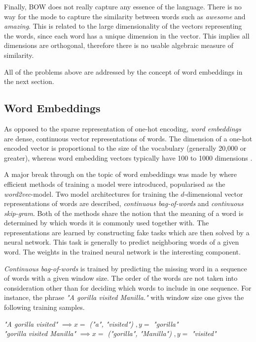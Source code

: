 Finally, BOW does not really capture any essence of the language. There is no way for the mode to capture the similarity between words such as \textit{awesome} and \textit{amazing}. This is related to the large dimensionality of the vectors representing the words, since each word has a unique dimension in the vector. This implies all dimensions are orthogonal, therefore there is no usable algebraic measure of similarity. 


All of the problems above are addressed by the concept of word embeddings in the next section. 




\subsection{Word Embeddings}

As opposed to the sparse representation of one-hot encoding, \textit{word embeddings} are dense, continuous vector representations of words. The dimension of a one-hot encoded vector is proportional to the size of the vocabulary (generally 20,000 or greater), whereas word embedding vectors typically have 100 to 1000 dimensions \citet{chollet2017deep}.

A major break through on the topic of word embeddings was made by \citep{mikolov2013efficient} where efficient methods of training a model were introduced, popularised as the \textit{word2vec}-model. Two model architectures for training the $d$-dimensional vector representations of words are described, \textit{continuous bag-of-words} and \textit{continuous skip-gram}. Both of the methods share the  notion that the meaning of a word is determined by which words it is commonly used together with. The representations are learned by constructing fake tasks which are then solved by a neural network. This task is generally to predict neighboring words of a given word. The weights in the trained neural network is the interesting component.

\textit{Continuous bag-of-words} is trained by predicting the missing word in a sequence of words with a given window size. The order of the words are not taken into consideration other than for deciding which words to include in one sequence. For instance, the phrase \textit{"A gorilla visited Manilla."} with window size one gives the following training samples.
\begin{center}
\textit{"A gorilla visited"} $\implies x = $ \textit{("a", "visited")} $,y = $ \textit{"gorilla"} \\ \vspace{1em}
\textit{"gorilla visited Manilla"} $\implies x = $ \textit{("gorilla", "Manilla")} $,y = $ \textit{"visited"} \\
\end{center}

